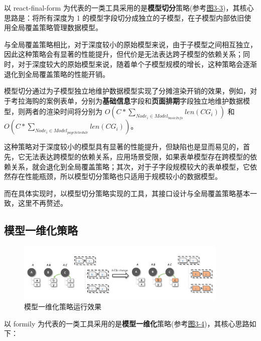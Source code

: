\documentclass[winfonts,master,twoside]{njuthesis}
\begin{document}
以 react-final-form 为代表的一类工具采用的是\textbf{模型切分}策略(参考\hyperref[model-split]{图3-3})，其核心思路是：将所有深度为 1 的模型字段切分成独立的子模型，在子模型内部依旧使用全局覆盖策略管理数据模型。

与全局覆盖策略相比，对于深度较小的原始模型来说，由于子模型之间相互独立，因此这种策略会有显著的性能提升，但代价是无法表达跨子模型的依赖关系；同时，对于深度较大的原始模型来说，随着单个子模型规模的增长，这种策略会逐渐退化到全局覆盖策略的性能开销。

模型切分通过为子模型独立地维护数据模型实现了分摊渲染开销的效果，例如，对于考拉海购的案例表单，分别为\textbf{基础信息}字段和\textbf{页面排期}字段独立地维护数据模型，则两者的渲染时间将分别为 $O(C*\sum_{Node_i\in Model_{basicInfo}}len(CG_i))$ 和 $O(C*\sum_{Node_i\in Model_{pageSchedule}}len(CG_i))$。

这种策略对于深度较小的模型具有显著的性能提升，但缺陷也是显而易见的，首先，它无法表达跨模型的依赖关系，应用场景受限，如果表单模型存在跨模型的依赖关系，就会退化到全局覆盖策略；其次，对于子字段规模较大的表单模型，它依然存在性能瓶颈，所以模型切分策略也只适用于规模较小的数据模型。

而在具体实现时，以模型切分策略实现的工具，其接口设计与全局覆盖策略基本一致，这里不再赘述。

\subsection{模型一维化策略}

\begin{figure}[h]
    \centering
    \includegraphics[width=0.9\textwidth]{figure/chapter-2/model-1d.png}
    \caption{模型一维化策略运行效果}
    \label{model-1d}
\end{figure}

以 formily 为代表的一类工具采用的是\textbf{模型一维化}策略(参考\hyperref[model-1d]{图3-4})，其核心思路如下：
\end{document}
